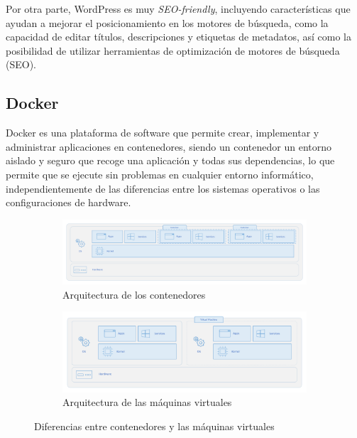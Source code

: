             Por otra parte, WordPress es muy \textit{SEO-friendly}, incluyendo características que ayudan a mejorar el posicionamiento en los motores de búsqueda, como la capacidad de editar títulos, descripciones y etiquetas de metadatos, así como la posibilidad de utilizar herramientas de optimización de motores de búsqueda (SEO).
            
            \newpage

            
        \subsection{Docker}
            \label{sec:docker}
        
            Docker es una plataforma de software que permite crear, implementar y administrar aplicaciones en contenedores, siendo un contenedor un entorno aislado y seguro que recoge una aplicación y todas sus dependencias, lo que permite que se ejecute sin problemas en cualquier entorno informático, independientemente de las diferencias entre los sistemas operativos o las configuraciones de hardware.
            
            \begin{figure}[h]
                \centering
                
                \begin{subfigure}[h]{\textwidth}
                    \includegraphics[width=\textwidth]{images/Diagramas/Esquema de Contenedores.png}
                    \caption{Arquitectura de los contenedores}
                    \label{fig:arquitectura-contenedores}
                \end{subfigure}
                
                \begin{subfigure}[h]{\textwidth}
                    \includegraphics[width=\textwidth]{images/Diagramas/Esquema de MVs.png}
                    \caption{Arquitectura de las máquinas virtuales}
                    \label{fig:arquitectura-maquinasvirtuales}
                \end{subfigure}
                
                \caption{Diferencias entre contenedores y las máquinas virtuales}
                \label{fig:contenedores-vs-maquinasvirtuales}
            \end{figure}
            
